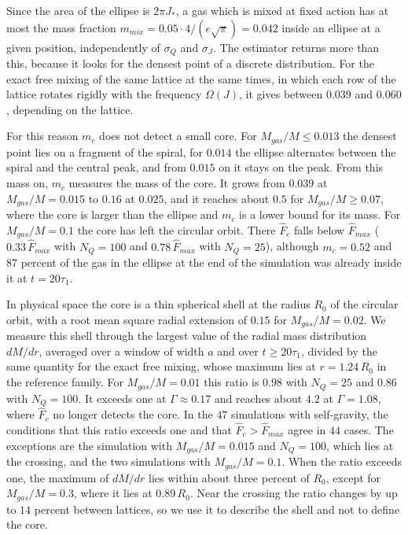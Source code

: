 Since the area of the ellipse is $2\pi J_*$, a gas which is mixed at fixed action has at most the mass fraction $m_{mix} = 0.05\cdot 4/(e\sqrt{\pi}) = 0.042$ inside an ellipse at a given position, independently of $\sigma_Q$ and $\sigma_J$. The estimator returns more than this, because it looks for the densest point of a discrete distribution. For the exact free mixing of the same lattice at the same times, in which each row of the lattice rotates rigidly with the frequency $\Omega(J)$, it gives between $0.039$ and $0.060$, depending on the lattice.

For this reason $m_c$ does not detect a small core. For $M_{gas}/M\leq 0.013$ the densest point lies on a fragment of the spiral, for $0.014$ the ellipse alternates between the spiral and the central peak, and from $0.015$ on it stays on the peak. From this mass on, $m_c$ measures the mass of the core. It grows from $0.039$ at $M_{gas}/M = 0.015$ to $0.16$ at $0.025$, and it reaches about $0.5$ for $M_{gas}/M\geq 0.07$, where the core is larger than the ellipse and $m_c$ is a lower bound for its mass. For $M_{gas}/M = 0.1$ the core has left the circular orbit. There $\hat{F}_c$ falls below $\hat{F}_{max}$ ($0.33\,\hat{F}_{max}$ with $N_Q = 100$ and $0.78\,\hat{F}_{max}$ with $N_Q = 25$), although $m_c = 0.52$ and $87$ percent of the gas in the ellipse at the end of the simulation was already inside it at $t = 20\tau_1$.

In physical space the core is a thin spherical shell at the radius $R_0$ of the circular orbit, with a root mean square radial extension of $0.15$ for $M_{gas}/M = 0.02$. We measure this shell through the largest value of the radial mass distribution $dM/dr$, averaged over a window of width $a$ and over $t\geq 20\tau_1$, divided by the same quantity for the exact free mixing, whose maximum lies at $r = 1.24\,R_0$ in the reference family. For $M_{gas}/M = 0.01$ this ratio is $0.98$ with $N_Q = 25$ and $0.86$ with $N_Q = 100$. It exceeds one at $\Gamma\approx 0.17$ and reaches about $4.2$ at $\Gamma = 1.08$, where $\hat{F}_c$ no longer detects the core. In the $47$ simulations with self-gravity, the conditions that this ratio exceeds one and that $\hat{F}_c > \hat{F}_{max}$ agree in $44$ cases. The exceptions are the simulation with $M_{gas}/M = 0.015$ and $N_Q = 100$, which lies at the crossing, and the two simulations with $M_{gas}/M = 0.1$. When the ratio exceeds one, the maximum of $dM/dr$ lies within about three percent of $R_0$, except for $M_{gas}/M = 0.3$, where it lies at $0.89\,R_0$. Near the crossing the ratio changes by up to $14$ percent between lattices, so we use it to describe the shell and not to define the core.

